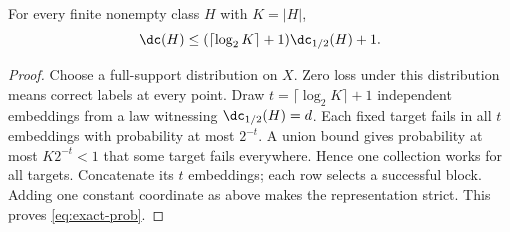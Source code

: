 \begin{lemma}\label{lem:exact-prob}
For every finite nonempty class $H$ with $K=|H|$,
\begin{equation}\label{eq:exact-prob}
 \dc(H)\le(\lceil\log_2K\rceil+1)\dc_{1/2}(H)+1.
\end{equation}
\end{lemma}

\begin{proof}
Choose a full-support distribution on $X$. Zero loss under this distribution means correct labels at every point. Draw $t=\lceil\log_2K\rceil+1$ independent embeddings from a law witnessing $\dc_{1/2}(H)=d$. Each fixed target fails in all $t$ embeddings with probability at most $2^{-t}$. A union bound gives probability at most $K2^{-t}<1$ that some target fails everywhere. Hence one collection works for all targets. Concatenate its $t$ embeddings; each row selects a successful block. Adding one constant coordinate as above makes the representation strict. This proves \eqref{eq:exact-prob}. 
\end{proof}
